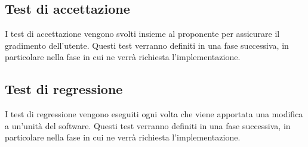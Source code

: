 \subsection{Test di accettazione}
    I test di accettazione vengono svolti insieme al proponente per assicurare il gradimento dell'utente. Questi test verranno definiti in una fase successiva, in particolare nella fase in cui ne verrà richiesta l'implementazione.
    
\subsection{Test di regressione}
    I test di regressione vengono eseguiti ogni volta che viene apportata una modifica a un'unità del software. Questi test verranno definiti in una fase successiva, in particolare nella fase in cui ne verrà richiesta l'implementazione.

